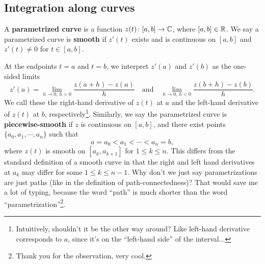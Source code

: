 \subsection{Integration along curves}
\begin{definition}
    A \textbf{parametrized curve} is a function $z(t) \colon [a,b] \to \mathbb{C}$, where $[a,b]\in \mathbb{R}$. We say a parametrized curve is \textbf{smooth} if $z'(t)$ exists and is continuous on $[a,b]$ and $z'(t)\neq 0$ for $t\in [a,b]$.
\end{definition}
At the endpoints $t=a$ and $t=b$, we interpret $z'(a)$ and $z'(b)$ as the one-sided limits \[
    z'(a)= \lim_{h\to 0, \,h>0}\frac{z(a+h)-z(a)}{h}\quad \text{and} \quad \lim_{h\to 0,\,h<0}\frac{z(b+h)-z(b)}{h}.
\] We call these the right-hand derivative of $z(t)$ at $a$ and the left-hand derivative of $z(t)$ at $b$, respectively\footnote{Intuitively, shouldn't it be the other way around? Like left-hand derivative  corresponds to $a$, since it's on the ``left-hand side'' of the interval...}. Similarly, we say the parametrized curve is \textbf{piecewise-smooth} if $z$ is continuous on $[a,b] $, and there exist points $\{a_0,a_1,\cdots ,a_n\} $ such that \[
a=a_0<a_1< \cdots < a_n=b,
\] where $z(t)$ is smooth on $[a_k,a_{k+1}]$ for $1\leq k \leq n$. This differs from the standard definition of a smooth curve in that the right and left hand derivatives at $a_k$ may differ for some $1\leq k\leq n-1$. Why don't we just say parametrizations are just paths (like in the definition of path-connectedness)? That would save me a lot of typing, because the word ``path'' is much shorter than the word ``parametrization''\footnote{Thank you for the observation, very cool.}.

